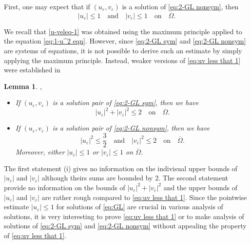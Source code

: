 \documentclass[a4paper,10pt,reqno]{amsart}
\newtheorem{lemma}[theorem]{Lemma}
\theoremstyle{definition}
\newcommand{\ve}{{\varepsilon}}
\newcommand{\Om}{{\Omega}}
\newcommand{\qand}{{\quad \mbox{and} \quad}}
\newcommand{\qon}{{\quad \mbox{on} \quad}}
\numberwithin{equation}{section}
\begin{document}
First, one may expect that  if $(u_\ve,v_\ve)$ is a solution of \eqref{eq:2-GL nonsym}, then
\begin{equation}\label{eq:uv less that 1}
|u_\ve|\le 1 \qand |v_\ve|\le 1 \qon \overline{\Om}.
\end{equation}

We recall that \eqref{u-veleq-1} was obtained using the maximum principle applied to the equation \eqref{eq:1-u^2 eqn}.
However, since \eqref{eq:2-GL sym} and \eqref{eq:2-GL nonsym} are systems of equations, it is not possible to derive such an estimate by simply applying the maximum principle.
Instead, weaker versions of \eqref{eq:uv less that 1} were established in \cite{HHS23ANONA,HHS-nonsym-deg-0}

\smallskip
\begin{lemma}\cite[Lemma 2.2]{HHS23ANONA}, \cite[Lemma 2.1]{HHS-nonsym-deg-0}
\label{lem:L-infty variant} $\;$
\begin{itemize}
\item[{\rm (i)}]
If  $(u_\ve,v_\ve) $ is a solution pair of  \eqref{eq:2-GL sym}, then we   have
\begin{equation}
\label{eq:L-infty var sym}
|u_\ve|^2 + |v_\ve|^2 \leq 2 \qon \overline\Om.
\end{equation}

\item[{\rm (ii)}]
If  $(u_\ve,v_\ve) $ is a solution pair of  \eqref{eq:2-GL nonsym}, then we   have
\begin{equation}
\label{eq:L-infty var}
|u_\ve|^2  \leq \frac{3}{2} \qand  |v_\ve|^2 \leq 2 \qon \overline\Om.
\end{equation}
Moreover, either $|u_\ve|\le 1$ or $|v_\ve| \le 1$ on $\overline\Om$.
\end{itemize}
\end{lemma}
\smallskip

The first statement (i) gives no information on the indivisual upper bounds of $|u_\ve|$ and $|v_\ve|$ although theirs sums are bounded by $2$.
The second statement provide no information on the bounds of $|u_\ve|^2 + |v_\ve|^2$ and the upper bounds of $|u_\ve|$ and $|v_\ve|$ are rather rough compared to \eqref{eq:uv less that 1}.
Since the pointwise estimate $|u_\ve|\le 1$ for solutions of \eqref{eq:GL} are crucial in various analysis of solutions, it is very interesting to prove \eqref{eq:uv less that 1} or to make analysis of solutions of \eqref{eq:2-GL sym} and \eqref{eq:2-GL nonsym} without appealing the property of \eqref{eq:uv less that 1}.
\end{document}
